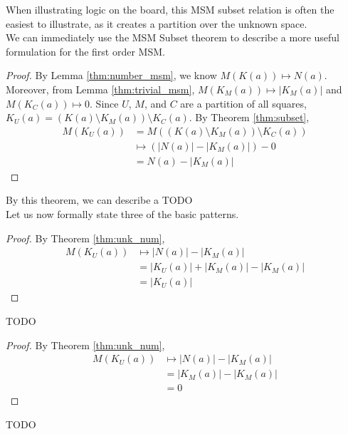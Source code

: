 When illustrating logic on the board, this MSM subset relation is often the easiest to  illustrate, as it creates a partition over the unknown space.\\

We can immediately use the MSM Subset theorem to describe a more useful formulation for the first order MSM.

\begin{proof}
    By Lemma \ref{thm:number_msm}, we know $M(K(a))\mapsto N(a)$. Moreover, from Lemma \ref{thm:trivial_msm}, $M(K_M(a))\mapsto|K_M(a)|$ and $M(K_C(a))\mapsto0$. Since $U$, $M$, and $C$ are a partition of all squares, $K_U(a)=(K(a)\setminus K_M(a))\setminus K_C(a)$. By Theorem \ref{thm:subset},\begin{align*}
    M(K_U(a))&=M((K(a)\setminus K_M(a))\setminus K_C(a))\\
    &\mapsto(|N(a)|-|K_M(a)|)-0\\
    &=N(a)-|K_M(a)|
\end{align*}
\end{proof}

By this theorem, we can describe a TODO\\

Let us now formally state three of the basic patterns.
\begin{proof}
By Theorem \ref{thm:unk_num},\begin{align*}
    M(K_U(a))&\mapsto|N(a)|-|K_M(a)|\\
    &=|K_U(a)|+|K_M(a)|-|K_M(a)|\\
    &=|K_U(a)|
\end{align*}
\end{proof}

TODO\\

\begin{proof}
    By Theorem \ref{thm:unk_num}, \begin{align*}
    M(K_U(a))&\mapsto|N(a)|-|K_M(a)|\\
    &=|K_M(a)|-|K_M(a)|\\
    &=0
\end{align*}
\end{proof}

TODO\\

